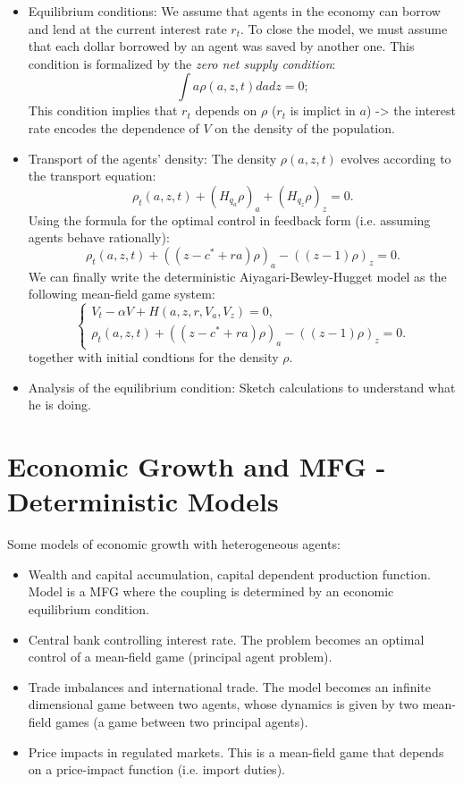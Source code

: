 \documentclass{article}
\begin{document}
\begin{itemize}
    \item Equilibrium conditions: We assume that agents in the economy can borrow and lend at the current
    interest rate $r_t$. To close the model, we must assume that each dollar borrowed by an agent was
    saved by another one. This condition is formalized by the {\it zero net supply condition}:
    $$
    \int a \rho(a,z,t) da dz = 0;
    $$
    This condition implies that $r_t$ depends on $\rho$ ($r_t$ is implict in $a$) -> the interest rate encodes
    the dependence of $V$ on the density of the population.

    \item Transport of the agents' density: The density $\rho(a,z,t)$ evolves according to
    the transport equation:
    $$
    \rho_t (a,z,t) + (H_{q_a} \rho)_a + (H_{q_z} \rho)_z = 0.
    $$
    Using the formula for the optimal control in feedback form (i.e. assuming agents behave rationally):
    $$
    \rho_t(a,z,t) + (( z - c^* + ra) \rho)_a - ( (z - 1) \rho )_z = 0.
    $$
    We can finally write the deterministic Aiyagari-Bewley-Hugget model as the following mean-field game
    system:
    \begin{equation}
        \begin{cases}
            V_t - \alpha V + H(a,z,r,V_a,V_z) = 0,\\
            \rho_t (a,z,t) + (( z - c^* + ra) \rho)_a - ((z-1) \rho)_z = 0.
        \end{cases}
    \end{equation}
    together with initial condtions for the density $\rho$.

    \item Analysis of the equilibrium condition: 
        Sketch calculations to understand what he is doing.
\end{itemize}

\section{Economic Growth and MFG - Deterministic Models}

    Some models of economic growth with heterogeneous agents:
    \begin{itemize}
        \item Wealth and capital accumulation, capital dependent production function. 
        Model is a MFG where the coupling is determined by an economic equilibrium condition.
        \item Central bank controlling interest rate. The problem becomes an optimal control
        of a mean-field game (principal agent problem).
        \item Trade imbalances and international trade. The model becomes an infinite
        dimensional game between two agents, whose dynamics is given by two mean-field games
        (a game between two principal agents).
        \item Price impacts in regulated markets. This is a mean-field game that depends
        on a price-impact function (i.e. import duties). 
    \end{itemize}
   
\end{document}
